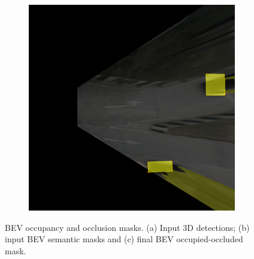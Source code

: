 \begin{figure}[h!]
\begin{subfigure}[b]{0.3\textwidth}
        \caption{}
        \label{fig:bev_occupancy_occlusion_b}
    \end{subfigure}
    \hfill
    \begin{subfigure}[b]{0.3\textwidth}
        \includegraphics[width=\textwidth]{images/methodology/bev_occupancy_oclusion/bev_occ_9.png}
        \caption{}
        \label{fig:bev_occupancy_occlusion_c}
    \end{subfigure}

    \caption{BEV occupancy and occlusion masks. (a) Input 3D detections; (b) input BEV semantic masks and (c) final BEV occupied-occluded mask.}
    \label{fig:bev_occupancy_occlusion}
\end{figure}

